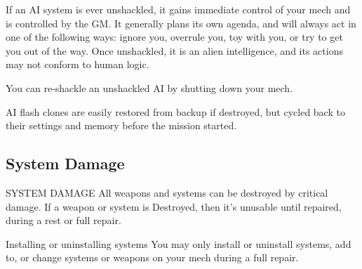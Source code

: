 If an AI system is ever unshackled, it gains immediate control of your mech and is controlled by  
the GM. It generally plans its own agenda, and will always act in one of the following ways:  
ignore you, overrule you, toy with you, or try to get you out of the way. Once unshackled, it is  
an alien intelligence, and its actions may not conform to human logic.   

You can re-shackle an unshackled AI by shutting down your mech.
 

AI flash clones are easily restored from backup if destroyed, but cycled back to their settings and  
memory before the mission started.
 
\subsection{System Damage}
                                           SYSTEM DAMAGE  
All weapons and systems can be destroyed by critical damage. If a weapon or system is  
Destroyed, then it’s unusable until repaired, during a rest or full repair.
 

Installing or uninstalling systems  
You may only install or uninstall systems, add to, or change systems or weapons on your mech  
during a full repair.
 

                                                                     